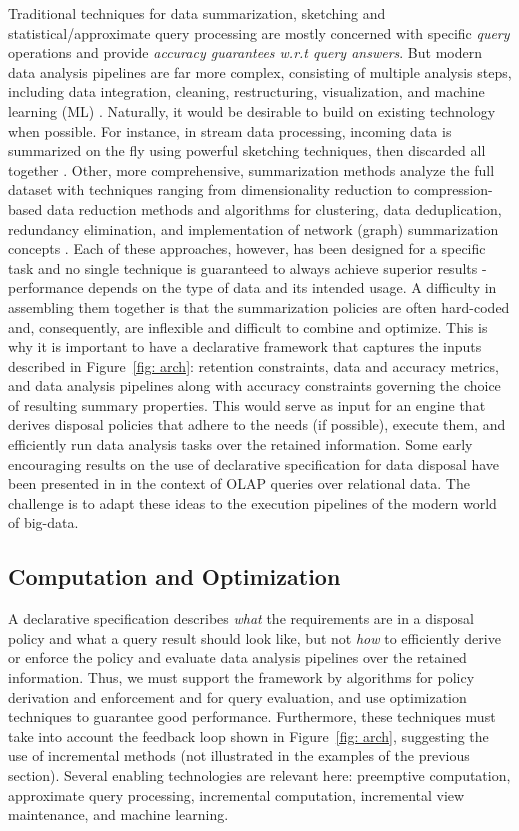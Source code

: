 \documentclass[11pt,dvipdfm]{article}
\begin{document}
Traditional techniques for data summarization, sketching and
statistical/approximate query processing are mostly concerned with
specific {\em query} operations and provide {\em accuracy guarantees
w.r.t query answers}. But modern data analysis pipelines are far
more complex, consisting of multiple analysis steps, including data
integration, cleaning, restructuring, visualization, and machine
learning (ML) \cite{bigdatajag}. 
Naturally, it would be desirable to build on existing technology
when possible. 
For instance, in stream data
processing, incoming data is summarized on the fly using powerful
sketching techniques, then discarded all together \cite{streaming}.
Other, more comprehensive, summarization methods analyze the full
dataset with techniques ranging from dimensionality reduction to
compression-based data reduction methods and algorithms for
clustering, data deduplication, redundancy elimination, and
implementation of network (graph) summarization concepts
\cite{summerization,graph}. Each of these approaches, however, has been
designed for a specific task and no single technique is guaranteed
to always achieve superior results - performance depends on the type
of data and its intended usage. A difficulty in assembling them
together is that the summarization policies are often hard-coded
and, consequently, are inflexible and difficult to combine and
optimize. 
This is why it is important to have a
declarative framework that captures the inputs described in Figure~\ref{fig: arch}:  retention constraints, data and accuracy metrics, and data analysis pipelines along with accuracy constraints governing the choice of resulting summary properties. This would serve as
input for an engine that derives disposal policies that adhere to the needs (if possible), execute them, and efficiently run data
analysis tasks over the retained information. Some early encouraging
results on the use of declarative specification for data disposal
have been presented in \cite{jensen} in the context of OLAP queries over relational data. The challenge is to adapt these
ideas to the execution pipelines of the modern world of big-data.



\subsection{Computation and Optimization}

A declarative specification describes {\em what} the
requirements are in a disposal policy and what a query result
should look like, but not {\em how} to efficiently derive or enforce
the policy and evaluate data analysis pipelines over the retained information. Thus,
we must support the framework by algorithms for policy derivation
and enforcement and for query evaluation, and use
optimization techniques to guarantee good performance. Furthermore, these techniques must take into account the feedback loop shown in Figure~\ref{fig: arch}, suggesting the use of incremental methods (not illustrated in the examples of the previous section).
Several enabling technologies are relevant here:  preemptive computation, approximate query processing, incremental computation, incremental view maintenance, and machine learning.
\end{document}
